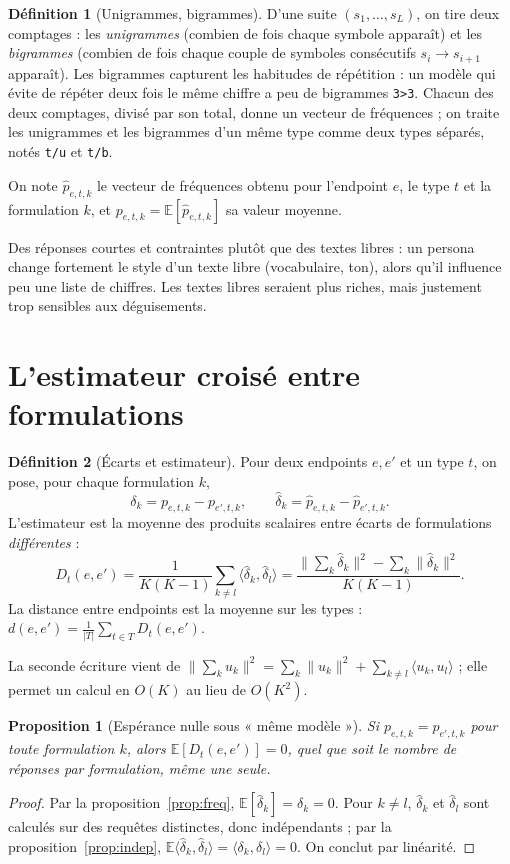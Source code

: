 \documentclass[11pt,a4paper]{report}
\theoremstyle{definition}
\newtheorem{definition}{Définition}[chapter]
\theoremstyle{plain}
\newtheorem{proposition}{Proposition}[chapter]
\newcommand{\E}{\mathbb{E}}
\newcommand{\code}[1]{\texttt{#1}}
\begin{document}
\begin{definition}[Unigrammes, bigrammes]
D'une suite $(s_1,\dots,s_L)$, on tire deux comptages : les \emph{unigrammes} (combien de fois chaque symbole apparaît) et les \emph{bigrammes} (combien de fois chaque couple de symboles consécutifs $s_i \to s_{i+1}$ apparaît). Les bigrammes capturent les habitudes de répétition : un modèle qui évite de répéter deux fois le même chiffre a peu de bigrammes \code{3>3}. Chacun des deux comptages, divisé par son total, donne un vecteur de fréquences ; on traite les unigrammes et les bigrammes d'un même type comme deux types séparés, notés \code{t/u} et \code{t/b}.
\end{definition}

On note $\hat p_{e,t,k}$ le vecteur de fréquences obtenu pour l'endpoint $e$, le type $t$ et la formulation $k$, et $p_{e,t,k} = \E[\hat p_{e,t,k}]$ sa valeur moyenne.

\begin{pourquoi}
Des réponses courtes et contraintes plutôt que des textes libres : un persona change fortement le style d'un texte libre (vocabulaire, ton), alors qu'il influence peu une liste de chiffres. Les textes libres seraient plus riches, mais justement trop sensibles aux déguisements.
\end{pourquoi}

\section{L'estimateur croisé entre formulations}

\begin{definition}[Écarts et estimateur]
Pour deux endpoints $e,e'$ et un type $t$, on pose, pour chaque formulation $k$,
\[
\delta_k = p_{e,t,k}-p_{e',t,k}, \qquad \hat\delta_k = \hat p_{e,t,k}-\hat p_{e',t,k}.
\]
L'estimateur est la moyenne des produits scalaires entre écarts de formulations \emph{différentes} :
\[
D_t(e,e') = \frac{1}{K(K-1)}\sum_{k\neq l}\langle\hat\delta_k,\hat\delta_l\rangle
= \frac{\bigl\|\sum_k\hat\delta_k\bigr\|^2 - \sum_k\|\hat\delta_k\|^2}{K(K-1)}.
\]
La distance entre endpoints est la moyenne sur les types : $d(e,e') = \frac1{|T|}\sum_{t\in T} D_t(e,e')$.
\end{definition}

La seconde écriture vient de $\|\sum_k u_k\|^2 = \sum_k\|u_k\|^2 + \sum_{k\neq l}\langle u_k,u_l\rangle$ ; elle permet un calcul en $O(K)$ au lieu de $O(K^2)$.

\begin{proposition}[Espérance nulle sous « même modèle »]\label{prop:nul}
Si $p_{e,t,k}=p_{e',t,k}$ pour toute formulation $k$, alors $\E[D_t(e,e')]=0$, quel que soit le nombre de réponses par formulation, même une seule.
\end{proposition}
\begin{proof}
Par la proposition~\ref{prop:freq}, $\E[\hat\delta_k] = \delta_k = 0$. Pour $k\neq l$, $\hat\delta_k$ et $\hat\delta_l$ sont calculés sur des requêtes distinctes, donc indépendants ; par la proposition~\ref{prop:indep}, $\E\langle\hat\delta_k,\hat\delta_l\rangle = \langle\delta_k,\delta_l\rangle = 0$. On conclut par linéarité.
\end{proof}
\end{document}
